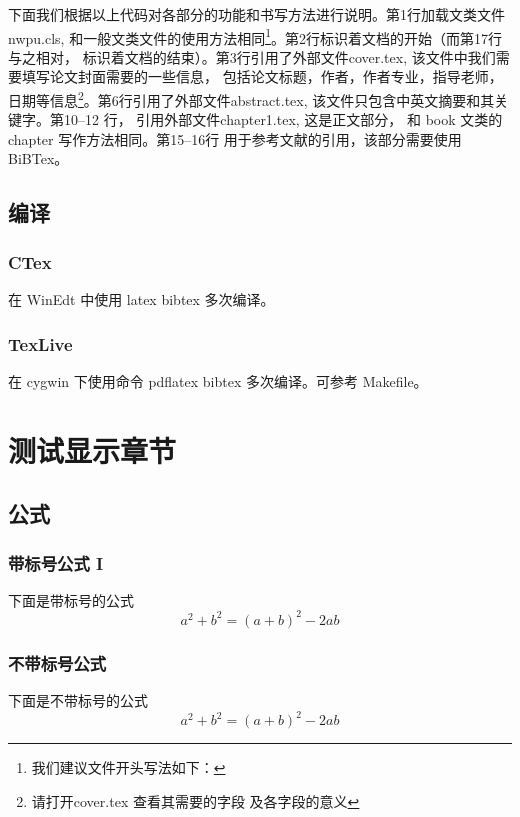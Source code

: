 \documentclass[twoside]{nwpu}
\begin{document}
                \par
                \vskip 20pt
            下面我们根据以上代码对各部分的功能和书写方法进行说明。第1行加载文类文件nwpu.cls, 
            和一般文类文件的使用方法相同\footnote{我们建议文件开头写法如下：
            }。第2行标识着文档的开始（而第17行与之相对， 
            标识着文档的结束）。第3行引用了外部文件cover.tex, 该文件中我们需要填写论文封面需要的一些信息，
            包括论文标题，作者，作者专业，指导老师，日期等信息\footnote{请打开cover.tex 查看其需要的字段
            及各字段的意义}。第6行引用了外部文件abstract.tex, 该文件只包含中英文摘要和其关键字。第10--12
            行， 引用外部文件chapter1.tex, 这是正文部分， 和 book 文类的 chapter 写作方法相同。第15--16行
            用于参考文献的引用，该部分需要使用BiBTex。\cite{LatexCompanion}
        \section{编译}
            \subsection{CTex}
                在 WinEdt 中使用 latex bibtex 多次编译。
            
            \subsection{TexLive}
                在 cygwin 下使用命令 pdflatex bibtex 多次编译。可参考 Makefile。

    \chapter{测试显示章节}
        \section{公式}
            \subsection{带标号公式 I}
                下面是带标号的公式
                \begin{equation} 
                    a^2 + b^2 = (a + b)^2 -2ab
                \end{equation}
            \subsection{不带标号公式}
                下面是不带标号的公式
                \begin{equation*} 
                    a^2 + b^2 = (a + b)^2 -2ab
                \end{equation*}
\end{document}
